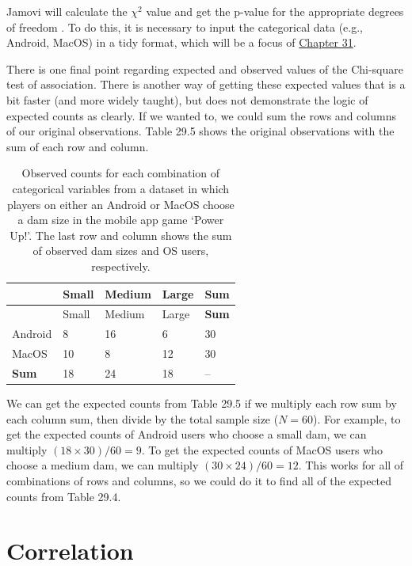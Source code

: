 \documentclass[
  openany]{scrbook}
\begin{document}
Jamovi will calculate the \(\chi^{2}\) value and get the p-value for the appropriate degrees of freedom \citep{Jamovi2022}.
To do this, it is necessary to input the categorical data (e.g., Android, MacOS) in a tidy format, which will be a focus of \protect\hyperlink{Chapter_31}{Chapter 31}.

There is one final point regarding expected and observed values of the Chi-square test of association.
There is another way of getting these expected values that is a bit faster (and more widely taught), but does not demonstrate the logic of expected counts as clearly.
If we wanted to, we could sum the rows and columns of our original observations.
Table 29.5 shows the original observations with the sum of each row and column.

\begin{longtable}[]{@{}lllll@{}}
\caption{\label{tab:unnamed-chunk-124}Observed counts for each combination of categorical variables from a dataset in which players on either an Android or MacOS choose a dam size in the mobile app game `Power Up!'. The last row and column shows the sum of observed dam sizes and OS users, respectively.}\tabularnewline
\toprule
& Small & Medium & Large & \textbf{Sum} \\
\midrule
\endfirsthead
\toprule
& Small & Medium & Large & \textbf{Sum} \\
\midrule
\endhead
Android & 8 & 16 & 6 & 30 \\
MacOS & 10 & 8 & 12 & 30 \\
\textbf{Sum} & 18 & 24 & 18 & -- \\
\bottomrule
\end{longtable}

We can get the expected counts from Table 29.5 if we multiply each row sum by each column sum, then divide by the total sample size (\(N = 60\)).
For example, to get the expected counts of Android users who choose a small dam, we can multiply \((18 \times 30)/60 = 9\).
To get the expected counts of MacOS users who choose a medium dam, we can multiply \((30 \times 24)/60 = 12\).
This works for all of combinations of rows and columns, so we could do it to find all of the expected counts from Table 29.4.

\hypertarget{Chapter_30}{%
\chapter{Correlation}\label{Chapter_30}}
\end{document}
